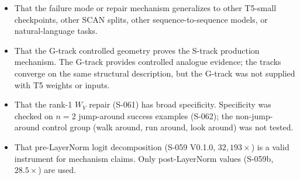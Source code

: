 \begin{itemize}
  \item That the failure mode or repair mechanism generalizes to other T5-small
    checkpoints, other SCAN splits, other sequence-to-sequence models, or
    natural-language tasks.
  \item That the G-track controlled geometry proves the S-track production mechanism.
    The G-track provides controlled analogue evidence; the tracks converge on the same
    structural description, but the G-track was not supplied with T5 weights or inputs.
  \item That the rank-1 $W_V$ repair (S-061) has broad specificity.
    Specificity was checked on $n=2$ jump-around success examples (S-062); the
    non-jump-around control group (walk around, run around, look around) was
    not tested.
  \item That pre-LayerNorm logit decomposition (S-059 V0.1.0, $32{,}193\times$)
    is a valid instrument for mechanism claims. Only post-LayerNorm values
    (S-059b, $28.5\times$) are used.
\end{itemize}

